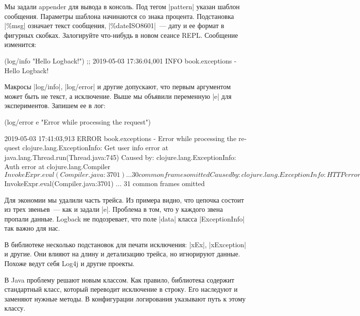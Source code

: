Мы задали appender для вывода в консоль. Под тегом \spverb|pattern| указан
шаблон сообщения. Параметры шаблона начинаются со знака процента. Подстановка
\spverb|\%msg| означает текст сообщения, \spverb|\%date{ISO8601}|~--- дату и ее
формат в фигурных скобках. Залогируйте что-нибудь в новом сеансе REPL. Сообщение
изменится:

\begin{english}
  \begin{clojure}
(log/info "Hello Logback!")
;; 2019-05-03 17:36:04,001 INFO book.exceptions - Hello Logback!
  \end{clojure}
\end{english}

\label{log-ex-param}

Макросы \spverb|log/info|, \spverb|log/error| и другие допускают, что первым
аргументом может быть не текст, а исключение. Выше мы объявили переменную
\spverb|e| для экспериментов. Запишем ее в лог:

\begin{english}
  \begin{clojure}
(log/error e "Error while processing the request")

2019-05-03 17:41:03,913 ERROR book.exceptions - Error while processing the request
clojure.lang.ExceptionInfo: Get user info error
    at java.lang.Thread.run(Thread.java:745)
Caused by: clojure.lang.ExceptionInfo: Auth error
    at clojure.lang.Compiler$InvokeExpr.eval(Compiler.java:3701)
    ... 30 common frames omitted
Caused by: clojure.lang.ExceptionInfo: HTTP error
    at clojure.lang.Compiler$InvokeExpr.eval(Compiler.java:3701)
    ... 31 common frames omitted
  \end{clojure}
\end{english}

Для экономии мы удалили часть трейса. Из примера видно, что цепочка состоит из
трех звеньев~--- как и задали \spverb|e|. Проблема в том, что у каждого звена
пропали данные. Logback не подозревает, что поле \spverb|data| класса
\spverb|ExceptionInfo| так важно для нас.

В библиотеке несколько подстановок для печати исключения: \spverb|xEx|,
\spverb|xException| и другие. Они влияют на длину и детализацию трейса, но
игнорируют данные. Похоже ведут себя Log4j и другие проекты.

В Java проблему решают новым классом. Как правило, библиотека содержит
стандартный класс, который переводит исключение в строку. Его наследуют и
заменяют нужные методы. В конфигурации логирования указывают путь к этому
классу.

